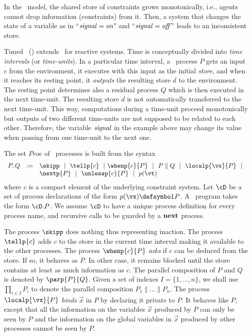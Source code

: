 \documentclass{tlp}
\begin{document}
In the \ccp\ model,  the shared store of constraints grows
monotonically, i.e., agents cannot drop information (constraints)
from it. Then, a system that changes the state of a  variable as in  ``${\it signal=on}$" and ``${\it signal=off}" $ leads to an inconsistent store. 

Timed \ccp\   (\tccp) \cite{tcc-lics94} extends \ccp\  for
reactive  systems. Time is conceptually divided into \emph{time
intervals }(or \emph{time-units}). In a particular time
interval, a \ccp\ process $P$  gets an input  $c$
from the environment, it executes with this input as the initial
\emph{store}, and when it reaches
its resting point, it \emph{outputs} the resulting store $d$ to the
environment. The resting point determines also a residual process $Q$
which is then executed in the next time-unit. The resulting store $d$
is not automatically transferred to the next time-unit.
This way, computations during a time-unit proceed monotonically but
outputs of two different time-units are not supposed to be related to
each other. Therefore, the variable ${\it signal}$ in the example
above may change its value when passing from one 
time-unit to the next one.  
\begin{definition}\label{tcc:syntax} The set
$Proc$ of \tccp\ processes is built from the syntax
\[
\begin{array}{lll}
P,Q &:=&  \skipp  \ \ |\  \  \tellp{c} \ \ |\  \whenp{c}{P} \ \ |\  \
P\parallel
Q \ \ |\  \  \localp{\vx }{P} \ \ |\  \\ 
  & &  \nextp{P}  \ \ |\  \  \unlessp{c}{P}     
\ \ | \ \ p(\vt)
   \end{array}
\]
where $c$ is a compact element of the underlying constraint system.
Let $\cD$ be a set of process declarations of the form
$p(\vx)\defsymbol P$. A \tccp\ program takes the form $\cD.P$.  We assume $\cD$ to have a unique process definition for every process name, and recursive calls to be guarded by a ${\bf next}$ process. 
\end{definition}

The process $\skipp$ does nothing thus representing inaction. The
process  $\tellp{c}$ adds $c$ to the store in the current time
interval making it available to the other processes. 
The process $\whenp{c}{P}$ \emph{asks} if $c$ can be deduced from the
store. If so, it behaves as $P$. In other case, it remains blocked
until the store contains at least as much information as $c$.
 The parallel composition of $P$ and $Q$  is denoted by
$\parp{P}{Q}$. Given a  set of indexes $I=\{1,...,n\}$, we shall use
$\prod\limits_{i\in I} P_i$ to denote the parallel composition $P_{1}
\parallel ... \parallel P_{n}$. 
The process  \(\localp{\vx}{P} \)  \emph{binds}  $\vec{x}$ in
$P$ by declaring it private to $P$.  It behaves like $P$, except that
all the information on  the variables $\vec{x}$
produced by $P$ can only be seen by $P$  and the information on the
global variables in $\vec{x}$  produced by other processes cannot be
seen by $P$. 
\end{document}
